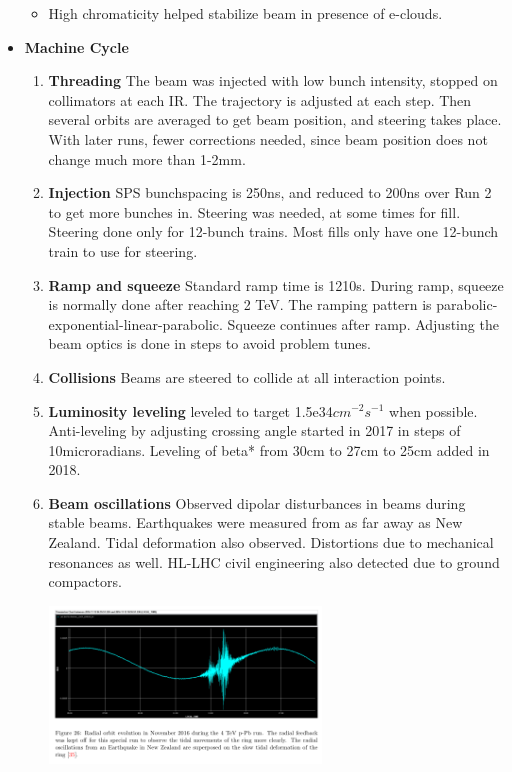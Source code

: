 \begin{itemize}
\begin{itemize}
        \item High chromaticity helped stabilize beam in presence of e-clouds. \cite{lhcRun2}
    \end{itemize}
    \item \textbf{Machine Cycle} \cite{lhcRun2}
    \begin{enumerate}
        \item \textbf{Threading} The beam was injected with low bunch intensity, stopped on collimators at each IR. The trajectory is adjusted at each step. Then several orbits are averaged to get beam position, and steering takes place. With later runs, fewer corrections needed, since beam position does not change much more than 1-2mm. \cite{lhcRun2}
        \item \textbf{Injection} SPS bunchspacing is 250ns, and reduced to 200ns over Run 2 to get more bunches in. Steering was needed, at some times for fill. Steering done only for 12-bunch trains. Most fills only have one 12-bunch train to use for steering. \cite{lhcRun2}
        \item \textbf{Ramp and squeeze} Standard ramp time is 1210s. During ramp, squeeze is normally done after reaching 2 TeV. The ramping pattern is parabolic-exponential-linear-parabolic. Squeeze continues after ramp. Adjusting the beam optics is done in steps to avoid problem tunes. \cite{lhcRun2}
        \item \textbf{Collisions} Beams are steered to collide at all interaction points. \cite{lhcRun2}
        \item \textbf{Luminosity leveling} leveled to target 1.5e34$cm^{-2}s^{-1}$ when possible. Anti-leveling by adjusting crossing angle started in 2017 in steps of 10microradians. Leveling of beta* from 30cm to 27cm to 25cm added in 2018. \cite{lhcRun2}
        \item \textbf{Beam oscillations} Observed dipolar disturbances in beams during stable beams. Earthquakes were measured from as far away as New Zealand. Tidal deformation also observed. Distortions due to mechanical resonances as well. HL-LHC civil engineering also detected due to ground compactors. \\ \cite{lhcRun2}
        \begin{center}
        \includegraphics[width=0.6\textwidth]{figures/notes-experiment/orbit.png}

\end{center}
\end{enumerate}
\end{itemize}
